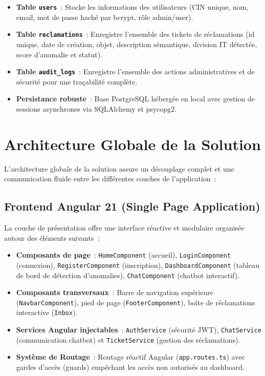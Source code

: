 \documentclass[12pt,a4paper]{report}
\begin{document}
\begin{itemize}[noitemsep]
    \item \textbf{Table \texttt{users}}~: Stocke les informations des utilisateurs (CIN unique, nom, email, mot de passe haché par bcrypt, rôle admin/user).
    \item \textbf{Table \texttt{reclamations}}~: Enregistre l'ensemble des tickets de réclamations (id unique, date de création, objet, description sémantique, division IT détectée, score d'anomalie et statut).
    \item \textbf{Table \texttt{audit\_logs}}~: Enregistre l'ensemble des actions administratives et de sécurité pour une traçabilité complète.
    \item \textbf{Persistance robuste}~: Base PostgreSQL hébergée en local avec gestion de sessions asynchrones via SQLAlchemy et psycopg2.
\end{itemize}

\section{Architecture Globale de la Solution}

L'architecture globale de la solution assure un découplage complet et une communication fluide entre les différentes couches de l'application~:

\subsection{Frontend Angular 21 (Single Page Application)}

La couche de présentation offre une interface réactive et modulaire organisée autour des éléments suivants~:

\begin{itemize}[noitemsep]
    \item \textbf{Composants de page}~: \texttt{HomeComponent} (accueil), \texttt{LoginComponent} (connexion), \texttt{RegisterComponent} (inscription), \texttt{DashboardComponent} (tableau de bord de détection d'anomalies), \texttt{ChatComponent} (chatbot interactif).
    \item \textbf{Composants transversaux}~: Barre de navigation supérieure (\texttt{NavbarComponent}), pied de page (\texttt{FooterComponent}), boîte de réclamations interactive (\texttt{Inbox}).
    \item \textbf{Services Angular injectables}~: \texttt{AuthService} (sécurité JWT), \texttt{ChatService} (communication chatbot) et \texttt{TicketService} (gestion des réclamations).
    \item \textbf{Système de Routage}~: Routage réactif Angular (\texttt{app.routes.ts}) avec gardes d'accès (guards) empêchant les accès non autorisés au dashboard.
\end{itemize}
\end{document}
